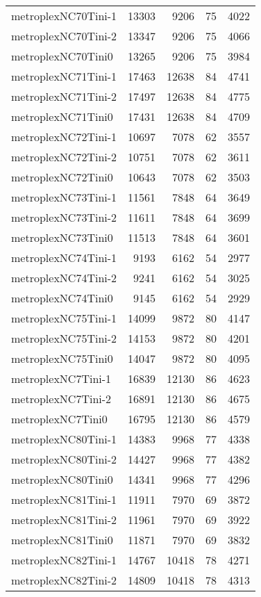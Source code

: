 \begin{tabular}{lrrrr}
metroplexNC70Tini-1 & 13303 & 9206 & 75 & 4022 \\
metroplexNC70Tini-2 & 13347 & 9206 & 75 & 4066 \\
metroplexNC70Tini0 & 13265 & 9206 & 75 & 3984 \\
metroplexNC71Tini-1 & 17463 & 12638 & 84 & 4741 \\
metroplexNC71Tini-2 & 17497 & 12638 & 84 & 4775 \\
metroplexNC71Tini0 & 17431 & 12638 & 84 & 4709 \\
metroplexNC72Tini-1 & 10697 & 7078 & 62 & 3557 \\
metroplexNC72Tini-2 & 10751 & 7078 & 62 & 3611 \\
metroplexNC72Tini0 & 10643 & 7078 & 62 & 3503 \\
metroplexNC73Tini-1 & 11561 & 7848 & 64 & 3649 \\
metroplexNC73Tini-2 & 11611 & 7848 & 64 & 3699 \\
metroplexNC73Tini0 & 11513 & 7848 & 64 & 3601 \\
metroplexNC74Tini-1 & 9193 & 6162 & 54 & 2977 \\
metroplexNC74Tini-2 & 9241 & 6162 & 54 & 3025 \\
metroplexNC74Tini0 & 9145 & 6162 & 54 & 2929 \\
metroplexNC75Tini-1 & 14099 & 9872 & 80 & 4147 \\
metroplexNC75Tini-2 & 14153 & 9872 & 80 & 4201 \\
metroplexNC75Tini0 & 14047 & 9872 & 80 & 4095 \\
metroplexNC7Tini-1 & 16839 & 12130 & 86 & 4623 \\
metroplexNC7Tini-2 & 16891 & 12130 & 86 & 4675 \\
metroplexNC7Tini0 & 16795 & 12130 & 86 & 4579 \\
metroplexNC80Tini-1 & 14383 & 9968 & 77 & 4338 \\
metroplexNC80Tini-2 & 14427 & 9968 & 77 & 4382 \\
metroplexNC80Tini0 & 14341 & 9968 & 77 & 4296 \\
metroplexNC81Tini-1 & 11911 & 7970 & 69 & 3872 \\
metroplexNC81Tini-2 & 11961 & 7970 & 69 & 3922 \\
metroplexNC81Tini0 & 11871 & 7970 & 69 & 3832 \\
metroplexNC82Tini-1 & 14767 & 10418 & 78 & 4271 \\
metroplexNC82Tini-2 & 14809 & 10418 & 78 & 4313 \\

\end{tabular}
